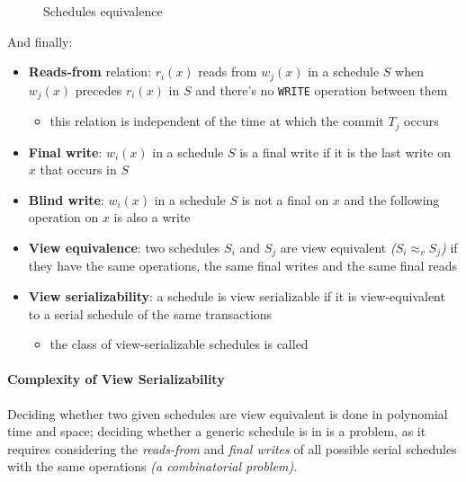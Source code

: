\documentclass[english]{article}
\begin{document}
\begin{figure}[htbp]
  \bigskip
  \centering
  \caption{Schedules equivalence}
  \label{fig:schedules-equivalence}
  \bigskip
\end{figure}

And finally:

\begin{itemize}
  \item \textbf{Reads-from} relation: \(r_i(x)\) reads from \(w_j(x)\) in a schedule \(S\) when \(w_j(x)\) precedes \(r_i(x)\) in \(S\) and there's no \texttt{WRITE} operation between them
        \begin{itemize}
          \item this relation is independent of the time at which the commit \(T_j\) occurs
        \end{itemize}
  \item \textbf{Final write}: \(w_i(x)\) in a schedule \(S\) is a final write if it is the last write on \(x\) that occurs in \(S\)
  \item \textbf{Blind write}: \(w_i(x)\) in a schedule \(S\) is not a final on \(x\) and the following operation on \(x\) is also a write
  \item \textbf{View equivalence}: two schedules \(S_i\) and \(S_j\) are view equivalent \textit{(\(S_i \approx_v S_j\))} if they have the same operations, the same final writes and the same final reads
  \item \textbf{View serializability}: a schedule is view serializable if it is view-equivalent to a serial schedule of the same transactions
        \begin{itemize}
          \item the class of view-serializable schedules is called \vsr
        \end{itemize}
\end{itemize}

\paragraph{Complexity of View Serializability}

Deciding whether two given schedules are view equivalent is done in polynomial time and space;
deciding whether a generic schedule is in \vsr is a \NPC problem, as it requires considering the \textit{reads-from} and \textit{final writes} of all possible serial schedules with the same operations \textit{(a combinatorial problem)}.
\end{document}
